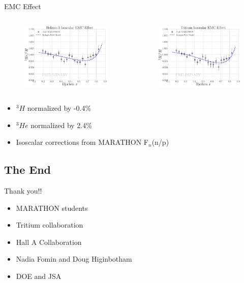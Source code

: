 \documentclass[12pt]{beamer}
\begin{document}
\begin{frame}{EMC Effect}
\vspace*{-20pt}
\begin{columns}
	\hspace*{-30pt}
	\begin{figure}
		\includegraphics[width=6.35cm]{../images/He3_EMC_MARA.pdf}
	\end{figure}
	\begin{figure}
		\includegraphics[width=6.35cm]{../images/H3_EMC_MARA.pdf}
	\end{figure}
\end{columns}
\begin{itemize}
	\item $^3H$ normalized by -0.4\%
	\item $^3He$ normalized by 2.4\%
	\item Isoscalar corrections from MARATHON F$_n$(n/p)
\end{itemize}

\end{frame}

\subsection[The End]{The End}
\begin{frame}
\begin{block}{Thank you!!}
	\begin{itemize}
		\item MARATHON students
		\item Tritium collaboration
		\item Hall A Collaboration
		\item Nadia Fomin and Doug Higinbotham
		\item DOE and JSA
	\end{itemize}
\end{block}
\end{frame}
\end{document}
